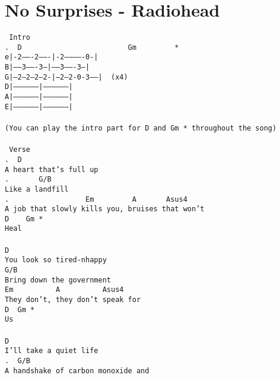 \newpage
\section{No Surprises - Radiohead}
\label{No Surprises - Radiohead}
\texttt{\lbrack\ Intro\rbrack\\
.\ \ D\ \ \ \ \ \ \ \ \ \ \ \ \ \ \ \ \ \ \ \ \ \ \ \ \ Gm\ \ \ \ \ \ \ \ \ *\\
e|-2-------2-------|-2-------------0-|\\
B|-----3-------3---|-----3-------3---|\\
G|---2---2---2---2-|---2---2-0-3-----|\ \ (x4)\\
D|-----------------|-----------------|\\
A|-----------------|-----------------|\\
E|-----------------|-----------------|\\
\\
(You\ can\ play\ the\ intro\ part\ for\ D\ and\ Gm\ *\ throughout\ the\ song)\\
\\
\lbrack\ Verse\rbrack\\
.\ \ D\\
A\ heart\ that's\ full\ up\\
.\ \ \ \ \ \ \ G/B\\
Like\ a\ landfill\\
.\ \ \ \ \ \ \ \ \ \ \ \ \ \ \ \ \ \ Em\ \ \ \ \ \ \ \ \ A\ \ \ \ \ \ \ Asus4\\
A\ job\ that\ slowly\ kills\ you,\ bruises\ that\ won't\\
D\ \ \ \ Gm\ *\\
Heal\\
\\
D\\
You\ look\ so\ tired-nhappy\\
G/B\\
Bring\ down\ the\ government\\
Em\ \ \ \ \ \ \ \ \ \ A\ \ \ \ \ \ \ \ \ \ Asus4\\
They\ don't,\ they\ don't\ speak\ for\\
D\ \ Gm\ *\\
Us\\
\\
D\\
I'll\ take\ a\ quiet\ life\\
.\ \ G/B\\
A\ handshake\ of\ carbon\ monoxide\ and\\
\\
}
